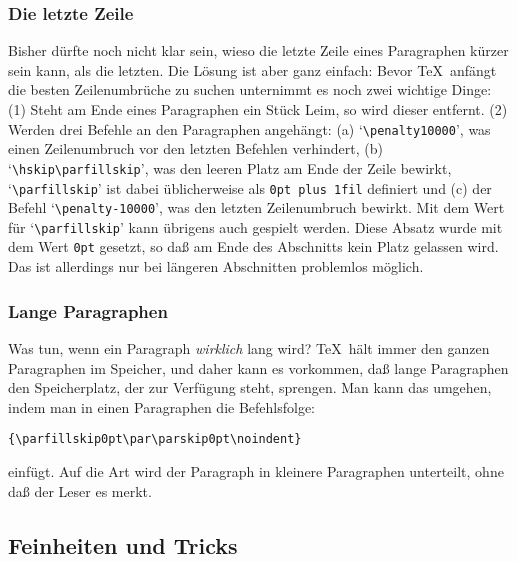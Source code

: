 \subsubsection{Die letzte Zeile}
{\parfillskip=0pt Bisher d\"urfte noch nicht klar sein, wieso die letzte
Zeile eines Paragraphen k\"urzer sein kann, als die letzten. Die L\"osung
ist aber ganz einfach: Bevor \TeX\ anf\"angt die besten Zeilenumbr\"uche
zu suchen unternimmt es noch zwei wichtige Dinge: (1) Steht am Ende
eines Paragraphen ein St\"uck 
Leim, so wird dieser entfernt. (2) Werden
drei Befehle an den Paragraphen angeh\"angt: (a)
`\verb|\penalty10000|',
was einen Zeilenumbruch vor den letzten Befehlen verhindert, (b)
`\verb|\hskip\parfillskip|', was den 
leeren Platz am Ende der Zeile
bewirkt, `\verb|\parfillskip|' ist dabei \"ublicherweise als {\tt 0pt
plus 1fil} definiert und (c) der Befehl `\verb|\penalty-10000|', was
den letzten Zeilenumbruch bewirkt. Mit dem Wert f\"ur
`\verb|\parfillskip|' kann \"ubrigens auch gespielt werden. Diese
Absatz
wurde mit dem Wert {\tt 0pt} gesetzt, so da\ss{} am Ende des Abschnitts
kein Platz gelassen wird. Das ist allerdings nur bei l\"angeren
Abschnitten problemlos m\"oglich.}

\subsubsection{Lange Paragraphen}
Was tun, wenn ein Paragraph {\em wirklich} lang wird? \TeX\ h\"alt immer
den ganzen Paragraphen im 
Speicher, und daher kann es vorkommen, da\ss{}
lange Paragraphen den 
Speicherplatz, der zur Verf\"ugung steht,
sprengen. Man kann das umgehen, indem man in einen Paragraphen die
Befehlsfolge:
\begin{verbatim}
{\parfillskip0pt\par\parskip0pt\noindent}
\end{verbatim}
einf\"ugt. Auf die Art wird der Paragraph in kleinere Paragraphen
unterteilt, ohne da\ss{} der Leser es merkt.
\subsection{Feinheiten und Tricks}
